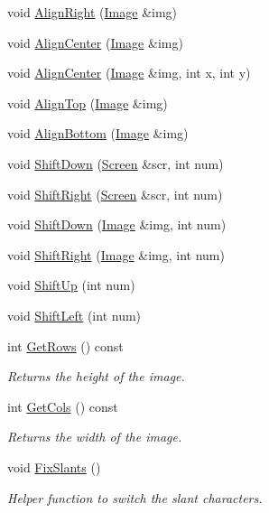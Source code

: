 \begin{DoxyCompactItemize}
void \hyperlink{classImage_a171b44f5d1ac53bfa9984a87c9786dd1}{Align\-Right} (\hyperlink{classImage}{Image} \&img)
\item 
void \hyperlink{classImage_a7471581b8a028a79fd87d741ae825e23}{Align\-Center} (\hyperlink{classImage}{Image} \&img)
\item 
void \hyperlink{classImage_a4607fa422c54fb4bf0412edd47214b40}{Align\-Center} (\hyperlink{classImage}{Image} \&img, int x, int y)
\item 
void \hyperlink{classImage_a12f3de115677e508268f5b7d3485b483}{Align\-Top} (\hyperlink{classImage}{Image} \&img)
\item 
void \hyperlink{classImage_a1bb0179923b51be9159fbd74b6f4f91f}{Align\-Bottom} (\hyperlink{classImage}{Image} \&img)
\item 
void \hyperlink{classImage_aed099dcc3c5113b7171daa35460df948}{Shift\-Down} (\hyperlink{classScreen}{Screen} \&scr, int num)
\item 
void \hyperlink{classImage_a1dc60415fb8f71c1c9345382be4ee32f}{Shift\-Right} (\hyperlink{classScreen}{Screen} \&scr, int num)
\item 
void \hyperlink{classImage_ad3fec1f163c82a6dc376e1727e42de30}{Shift\-Down} (\hyperlink{classImage}{Image} \&img, int num)
\item 
void \hyperlink{classImage_ae905765bb51e09a8252dcb157b2bcf28}{Shift\-Right} (\hyperlink{classImage}{Image} \&img, int num)
\item 
void \hyperlink{classImage_a8b15a9bbf2a56bd2105bbc1114bba173}{Shift\-Up} (int num)
\item 
void \hyperlink{classImage_a1bc3f79eeff5bfcc430299cb149071f5}{Shift\-Left} (int num)
\item 
int \hyperlink{classImage_a91b5bb5c3fef2795ec9838763536ed78}{Get\-Rows} () const 
\begin{DoxyCompactList}\small\item\em Returns the height of the image. \end{DoxyCompactList}\item 
int \hyperlink{classImage_a5377ce45ff29db084776e675b413f165}{Get\-Cols} () const 
\begin{DoxyCompactList}\small\item\em Returns the width of the image. \end{DoxyCompactList}\item 
void \hyperlink{classImage_a5c723d560bde4b6aa45f3eaa36ffb4f2}{Fix\-Slants} ()
\begin{DoxyCompactList}\small\item\em Helper function to switch the slant characters. \end{DoxyCompactList}\end{DoxyCompactItemize}
